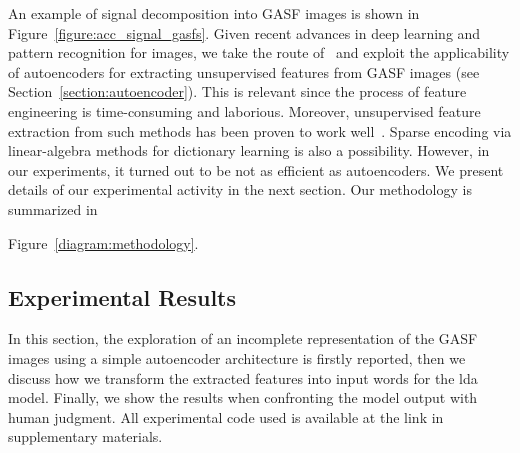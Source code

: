 An example of signal decomposition into GASF images is shown in Figure~\ref{figure:acc_signal_gasfs}. Given recent advances in deep learning and pattern recognition for images, we take the route of~\cite{wang_encoding_2015} and exploit the applicability of autoencoders for extracting unsupervised features from GASF images (see Section~\ref{section:autoencoder}). This is relevant since the process of feature engineering is time-consuming and laborious. Moreover, unsupervised feature extraction from such methods has been proven to work well~\cite{wang_imaging_2015, wang_time_2016}.
Sparse encoding via linear-algebra methods for dictionary learning is also a possibility. However, in our experiments, it turned out to be not as efficient as autoencoders. We present details of our experimental activity in the next section. Our methodology is summarized in {Figure~\ref{diagram:methodology}.

%
%

\subsection{Experimental Results}
In this section, the exploration of an incomplete representation of the GASF images using a simple autoencoder architecture is firstly reported, then we discuss how we transform the extracted features into input words for the \gls{lda} model. Finally, we show the results when confronting the model output with human judgment. All experimental code used is available at the link in supplementary materials. %

}
